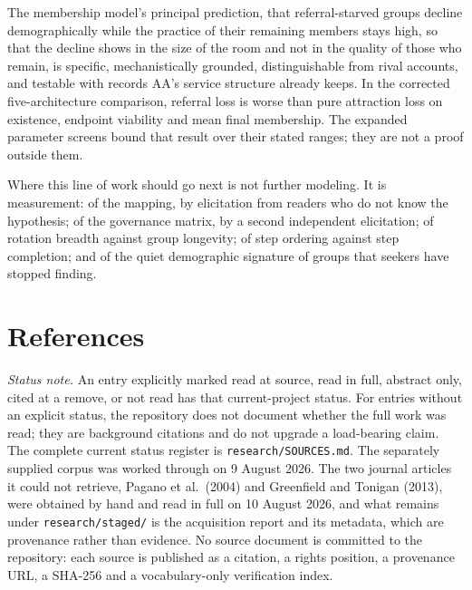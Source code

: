 \documentclass[11pt,a4paper]{article}
\begin{document}
The membership model's principal prediction, that referral-starved groups decline
demographically while the practice of their remaining members stays high, so that the
decline shows in the size of the room and not in the quality of those who remain, is specific, mechanistically
grounded, distinguishable from rival accounts, and testable with records AA's
service structure already keeps. In the corrected five-architecture comparison,
referral loss is worse than pure attraction loss on existence, endpoint viability
and mean final membership. The expanded parameter screens bound that result over
their stated ranges; they are not a proof outside them.

Where this line of work should go next is not further modeling. It is
measurement: of the mapping, by elicitation from readers who do not know the
hypothesis; of the governance matrix, by a second independent elicitation; of
rotation breadth against group longevity; of step ordering against step
completion; and of the quiet demographic signature of groups that seekers have
stopped finding.

\section*{References}

\noindent\textit{Status note.} An entry explicitly marked read at source, read in
full, abstract only, cited at a remove, or not read has that current-project
status. For entries without an explicit status, the repository does not document
whether the full work was read; they are background citations and do not upgrade
a load-bearing claim. The complete current status register is
\texttt{research/SOURCES.md}. The separately supplied corpus was worked through
on 9 August 2026. The two journal articles it could not retrieve, Pagano et al.\
(2004) and Greenfield and Tonigan (2013), were obtained by hand and read in full on
10 August 2026, and what remains under \texttt{research/staged/} is the acquisition
report and its metadata, which are provenance rather than evidence. No source
document is committed to the repository: each source is published as a citation,
a rights position, a provenance URL, a SHA-256 and a vocabulary-only
verification index.
\end{document}
